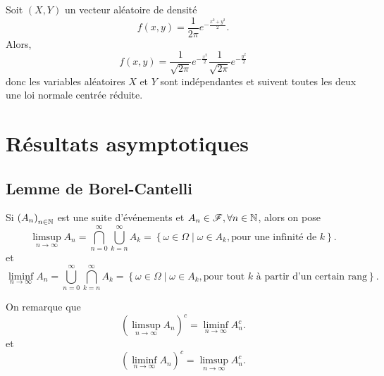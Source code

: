\begin{example}
    Soit \((X,Y)\) un vecteur aléatoire de densité
    \begin{equation*}
        f(x,y) = \frac{1}{2\pi}e^{-\frac{x^2+y^2}{2}}.
    \end{equation*}
    Alors,
    \begin{equation*}
        f(x,y) = \frac{1}{\sqrt{2\pi}}e^{-\frac{x^2}{2}}\frac{1}{\sqrt{2\pi}}e^{-\frac{y^2}{2}}
    \end{equation*}
    donc les variables aléatoires \(X\) et \(Y\) sont indépendantes et
    suivent toutes les deux une loi normale centrée réduite.
\end{example}

\section{Résultats asymptotiques} %

\subsection{Lemme de Borel-Cantelli} %

Si \({(A_n)}_{n\in\mathbb{N}}\) est une suite d'événements et \(A_n\in\mathscr{F}, \forall n\in\mathbb{N}\),
alors on pose
\begin{equation*}
    \limsup_{n\to\infty} A_n = \bigcap_{n=0}^\infty \bigcup_{k=n}^\infty A_k = \left\{ \omega\in\Omega\mid \omega\in A_k, \text{pour une infinité de } k \right\}.
\end{equation*}
et
\begin{equation*}
    \liminf_{n\to\infty} A_n = \bigcup_{n=0}^\infty \bigcap_{k=n}^\infty A_k = \left\{ \omega\in\Omega\mid \omega\in A_k, \text{pour tout } k \text{ à partir d'un certain rang} \right\}.
\end{equation*}

On remarque que
\begin{equation*}
    {(\limsup_{n\to\infty} A_n)}^c = \liminf_{n\to\infty} A_n^c.
\end{equation*}
et
\begin{equation*}
    {(\liminf_{n\to\infty} A_n)}^c = \limsup_{n\to\infty} A_n^c.
\end{equation*}

